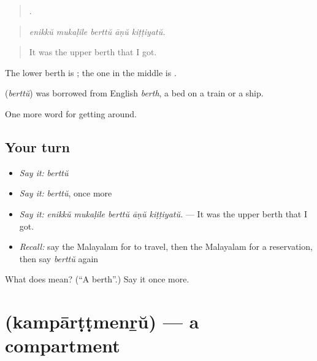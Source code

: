 \begin{quote}
    .
\end{quote}

\begin{quote}
\emph{enikkŭ mukaḷile berttŭ āṇŭ kiṭṭiyatŭ.}
\end{quote}

\begin{quote}
It was the upper berth that I got.
\end{quote}

The lower berth is  ; the one in the middle is  .

\begin{cousinweb}
\textbf{} (\emph{berttŭ}) was borrowed from English \emph{berth}, a bed on a train or a ship.
\end{cousinweb}

\begin{grammarlens}[title={What you've built}]
One more word for getting around.
\end{grammarlens}

\subsection*{Your turn}
\begin{itemize}
\raggedright
  \item \emph{Say it:} \emph{berttŭ}
  \item \emph{Say it:} \emph{berttŭ}, once more
  \item \emph{Say it:} \emph{enikkŭ mukaḷile berttŭ āṇŭ kiṭṭiyatŭ.} — It was the upper berth that I got.
  \item \emph{Recall:} say the Malayalam for to travel, then the Malayalam for a reservation, then say \emph{berttŭ} again
\end{itemize}

\begin{tcolorbox}[breakable,colback=teal!4,colframe=teal!35!black,title={Before you move on}]
What does  mean? (\textquotedblleft{}A berth\textquotedblright{}.) Say it once more.
\end{tcolorbox}
\section[\texorpdfstring{\ml{കമ്പാർട്ട്മെന്റ്} (kampārṭṭmenṟŭ)}{കമ്പാർട്ട്മെന്റ് (kampārṭṭmenṟŭ)}]{ (kampārṭṭmenṟŭ) — a compartment}

